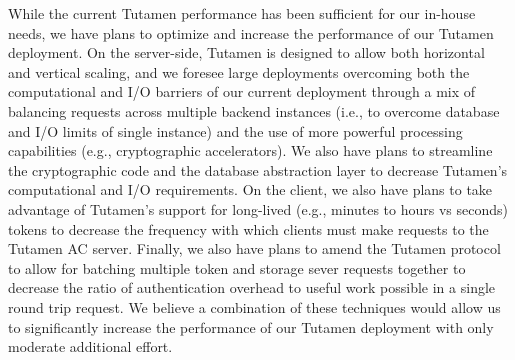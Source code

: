 While the current Tutamen performance has been sufficient for our
in-house needs, we have plans to optimize and increase the performance
of our Tutamen deployment. On the server-side, Tutamen is designed to
allow both horizontal and vertical scaling, and we foresee large
deployments overcoming both the computational and I/O barriers of our
current deployment through a mix of balancing requests across multiple
backend instances (i.e., to overcome database and I/O limits of single
instance) and the use of more powerful processing capabilities (e.g.,
cryptographic accelerators). We also have plans to streamline the
cryptographic code and the database abstraction layer to decrease
Tutamen's computational and I/O requirements. On the client, we also
have plans to take advantage of Tutamen's support for long-lived
(e.g., minutes to hours vs seconds) tokens to decrease the frequency
with which clients must make requests to the Tutamen AC
server. Finally, we also have plans to amend the Tutamen protocol to
allow for batching multiple token and storage sever requests together
to decrease the ratio of authentication overhead to useful work
possible in a single round trip request. We believe a combination of
these techniques would allow us to significantly increase the
performance of our Tutamen deployment with only moderate additional
effort.

